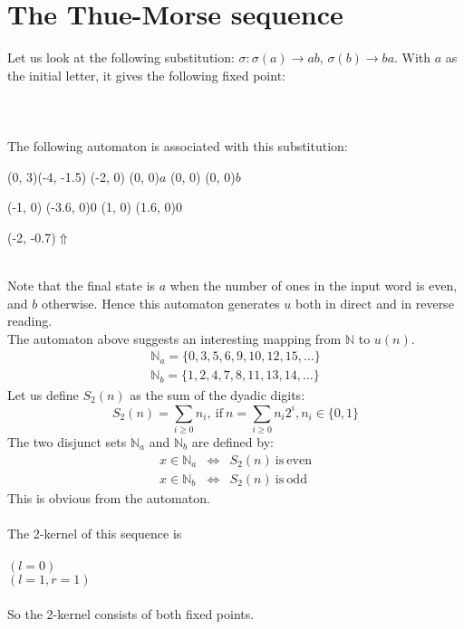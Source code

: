 \documentclass{article}
\begin{document}
\section*{The Thue-Morse sequence}
Let us look at the following substitution: $\sigma: \sigma(a) \to ab$,
$\sigma(b) \to ba$. With $a$ as the initial letter, it gives the
following fixed point:\\
\\
\\
\\
The following automaton is associated with this
substitution:\\
\begin{graph}(0, 3)(-4, -1.5)
  (-2, 0) (0, 0){$a$}
  (0, 0)  (0, 0){$b$}

  (-1, 0) \freetext(-3.6, 0){0}
   
   
  (1, 0) \freetext(1.6, 0){0}

  \freetext(-2, -0.7){$\Uparrow$}
\end{graph}\\
Note that the final state is $a$ when the number of ones in the input word
is even, and $b$ otherwise. Hence this automaton generates $u$ both in direct
and in reverse reading.\\
The automaton above suggests an interesting mapping from $\mathbb{N}$ to
$u(n)$. 
\begin{eqnarray*}
\mathbb{N}_a = \{0, 3, 5, 6, 9, 10, 12, 15, \ldots\}\\
\mathbb{N}_b = \{1, 2, 4, 7, 8, 11, 13, 14, \ldots\}
\end{eqnarray*}
Let us define $S_2(n)$ as the sum of the dyadic digits:
\begin{displaymath}
S_2(n) = \sum_{i \ge 0}n_i,\mathrm{\ if\ }
n = \sum_{i \ge 0}n_i2^i, n_i \in \{0, 1\}
\end{displaymath}
The two disjunct sets $\mathbb{N}_a$ and $\mathbb{N}_b$ are defined by:
\begin{eqnarray*}
x \in \mathbb{N}_a &\Leftrightarrow& S_2(n) \mathrm{\ is\ even}\\
x \in \mathbb{N}_b &\Leftrightarrow& S_2(n) \mathrm{\ is\ odd}
\end{eqnarray*}
This is obvious from the automaton.\\
\\
The 2-kernel of this sequence is\\
\\
 $(l = 0)$\\
 $(l = 1, r = 1)$\\
\\
So the 2-kernel consists of both fixed points.
\end{document}
